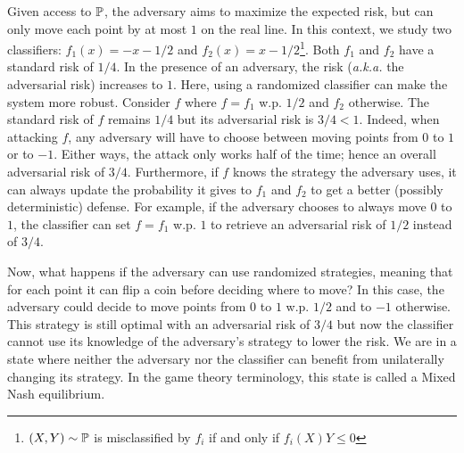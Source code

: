 Given access to $\mathbb{P}$, the adversary aims to maximize the expected risk, but can only move each point by at most $1$ on the real line. In this context, we study two classifiers: $f_1(x) = -x -1/2$ and $f_2(x)=x-1/2$\footnote{$(X,Y) \sim \mathbb{P}$ is misclassified by $f_i$ if and only if $f_i(X)Y \leq 0$}. Both $f_1$ and $f_2$ have a standard risk of $1/4$. In the presence of an adversary, the risk (\emph{a.k.a.} the adversarial risk) increases to $1$. Here, using a randomized classifier can make the system more robust. Consider $f$ where $f=f_1$ w.p. $1/2$ and $f_2$ otherwise. The standard risk of $f$ remains $1/4$ but its adversarial risk is $3/4<1$. Indeed, when attacking $f$, any adversary will have to choose between moving points from $0$ to $1$ or to $-1$. Either ways, the attack only works half of the time; hence an overall adversarial risk of $3/4$. Furthermore, if $f$ knows the strategy the adversary uses, it can always update the probability it gives to $f_1$ and $f_2$ to get a better (possibly deterministic) defense. For example, if the adversary chooses to always move $0$ to $1$, the classifier can set $f=f_1$ w.p. $1$ to retrieve an adversarial risk of $1/2$ instead of $3/4$. %

Now, what happens if the adversary can use randomized strategies, meaning that for each point it can flip a coin before deciding where to move? In this case, the adversary could decide to move points from $0$ to $1$ w.p. $1/2$ and to $-1$ otherwise. This strategy is still optimal with an adversarial risk of $3/4$ but now the classifier cannot use its knowledge of the adversary's strategy to lower the risk. We are in a state where neither the adversary nor the classifier can benefit from unilaterally changing its strategy. In the game theory terminology, this state is called a Mixed Nash equilibrium. %

